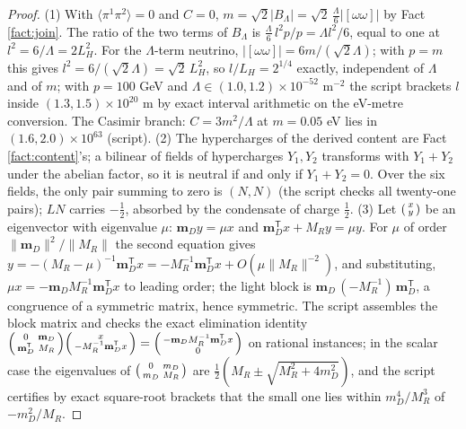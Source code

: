 \documentclass[11pt]{article}
\theoremstyle{definition}
\newcommand{\br}[1]{\langle #1\rangle}
\newcommand{\mD}{\mathbf{m}_{D}}
\newcommand{\LH}{L_{H}}
\begin{document}
\begin{proof}
(1) With $\br{\pi^{1}\pi^{2}} = 0$ and $C = 0$, $m = \sqrt{2}|B_{\Lambda}| = \sqrt{2}\,\tfrac{\Lambda}{6}|[\omega\omega]|$ by Fact \ref{fact:join}. The ratio of the two terms of $B_{\Lambda}$ is $\tfrac{\Lambda}{6}\,l^{2}p/p = \Lambda l^{2}/6$, equal to one at $l^{2} = 6/\Lambda = 2\LH^{2}$. For the $\Lambda$-term neutrino, $|[\omega\omega]| = 6m/(\sqrt{2}\Lambda)$; with $p = m$ this gives $l^{2} = 6/(\sqrt{2}\Lambda) = \sqrt{2}\,\LH^{2}$, so $l/\LH = 2^{1/4}$ exactly, independent of $\Lambda$ and of $m$; with $p = 100$ GeV and $\Lambda \in (1.0, 1.2) \times 10^{-52}$ m$^{-2}$ \cite{PDG2024} the script brackets $l$ inside $(1.3, 1.5) \times 10^{20}$ m by exact interval arithmetic on the eV-metre conversion. The Casimir branch: $C = 3m^{2}/\Lambda$ at $m = 0.05$ eV lies in $(1.6, 2.0) \times 10^{63}$ (script). (2) The hypercharges of the derived content are Fact \ref{fact:content}'s; a bilinear of fields of hypercharges $Y_{1}, Y_{2}$ transforms with $Y_{1} + Y_{2}$ under the abelian factor, so it is neutral if and only if $Y_{1} + Y_{2} = 0$. Over the six fields, the only pair summing to zero is $(N, N)$ (the script checks all twenty-one pairs); $L N$ carries $-\tfrac12$, absorbed by the condensate of charge $\tfrac12$. (3) Let $\begin{psmallmatrix} x \\ y \end{psmallmatrix}$ be an eigenvector with eigenvalue $\mu$: $\mD y = \mu x$ and $\mD^{\mathsf{T}}x + M_{R}y = \mu y$. For $\mu$ of order $\|\mD\|^{2}/\|M_{R}\|$ the second equation gives $y = -(M_{R} - \mu)^{-1}\mD^{\mathsf{T}}x = -M_{R}^{-1}\mD^{\mathsf{T}}x + O(\mu\|M_{R}\|^{-2})$, and substituting, $\mu x = -\mD M_{R}^{-1}\mD^{\mathsf{T}}x$ to leading order; the light block is $\mD\,(-M_{R}^{-1})\,\mD^{\mathsf{T}}$, a congruence of a symmetric matrix, hence symmetric. The script assembles the block matrix and checks the exact elimination identity $\begin{psmallmatrix} 0 & \mD \\ \mD^{\mathsf{T}} & M_{R}\end{psmallmatrix}\begin{psmallmatrix} x \\ -M_{R}^{-1}\mD^{\mathsf{T}}x\end{psmallmatrix} = \begin{psmallmatrix} -\mD M_{R}^{-1}\mD^{\mathsf{T}}x \\ 0\end{psmallmatrix}$ on rational instances; in the scalar case the eigenvalues of $\begin{psmallmatrix} 0 & m_{D} \\ m_{D} & M_{R}\end{psmallmatrix}$ are $\tfrac12(M_{R} \pm \sqrt{M_{R}^{2} + 4m_{D}^{2}})$, and the script certifies by exact square-root brackets that the small one lies within $m_{D}^{4}/M_{R}^{3}$ of $-m_{D}^{2}/M_{R}$.
\end{proof}
\end{document}
